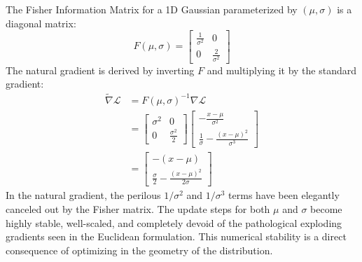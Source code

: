 The Fisher Information Matrix for a 1D Gaussian parameterized by $(\mu, \sigma)$ is a diagonal matrix:
\begin{equation}
    F(\mu, \sigma) = \begin{bmatrix}
    \frac{1}{\sigma^2} & 0 \\
    0 & \frac{2}{\sigma^2}
    \end{bmatrix}
\end{equation}
The natural gradient is derived by inverting $F$ and multiplying it by the standard gradient:
\begin{align}
    \tilde{\nabla} \mathcal{L} &= F(\mu, \sigma)^{-1} \nabla \mathcal{L} \\
    &= \begin{bmatrix}
    \sigma^2 & 0 \\
    0 & \frac{\sigma^2}{2}
    \end{bmatrix}
    \begin{bmatrix}
    -\frac{x - \mu}{\sigma^2} \\
    \frac{1}{\sigma} - \frac{(x - \mu)^2}{\sigma^3}
    \end{bmatrix} \\
    &= \begin{bmatrix}
    -(x - \mu) \\
    \frac{\sigma}{2} - \frac{(x - \mu)^2}{2\sigma}
    \end{bmatrix}
\end{align}
In the natural gradient, the perilous $1/\sigma^2$ and $1/\sigma^3$ terms have been elegantly canceled out by the Fisher matrix. The update steps for both $\mu$ and $\sigma$ become highly stable, well-scaled, and completely devoid of the pathological exploding gradients seen in the Euclidean formulation. This numerical stability is a direct consequence of optimizing in the geometry of the distribution.


